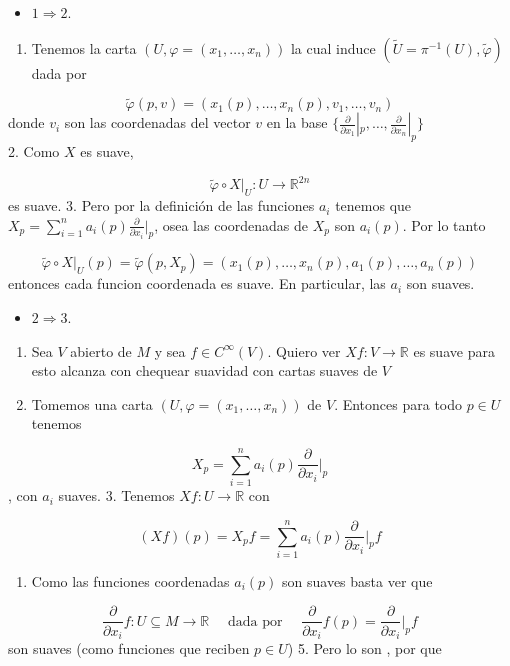 \begin{bookproof}{}
\begin{itemize}
\item $1 \Rightarrow 2$.
\end{itemize}
\begin{enumerate}
\item Tenemos la carta $(U,\varphi=(x_{1},\ldots,x_{n}))$ la cual induce $(\widetilde{U}=\pi ^{-1}(U),\widetilde{\varphi})$ dada por
\end{enumerate}
\[
\widetilde\varphi(p,v)=(x_1(p),\ldots,x_n(p),v_1,\ldots,v_n)
\]
donde $v_i$ son las coordenadas del vector $v$ en la base $\{ \frac{\partial}{\partial x_{1}}|_{p},\ldots,\frac{\partial}{\partial x_{n}}|_{p} \}$\\
2. Como $X$ es suave,

\[
\widetilde\varphi \circ X|_U:U \to \mathbb R^{2n}
\]
es suave. 3. Pero por la definición de las funciones $a_i$ tenemos que $X_p=\sum_{i=1}^n a_i(p)\frac{\partial}{\partial x_i}|_p$, osea las coordenadas de $X_p$ son $a_i(p)$. Por lo tanto

\[
\widetilde\varphi \circ X|_U(p)=\widetilde{\varphi}(p,X_{p})=(x_1(p),\ldots,x_n(p),a_1(p),\ldots,a_n(p))
\]
entonces cada funcion coordenada es suave. En particular, las $a_i$ son suaves.

\begin{itemize}
\item $2 \Rightarrow 3$.
\end{itemize}
\begin{enumerate}
\item Sea $V$ abierto de $M$ y sea $f \in C^\infty(V)$. Quiero ver $Xf:V\rightarrow\mathbb{R}$ es suave para esto alcanza con chequear suavidad con cartas suaves de $V$
\item Tomemos una carta $(U,\varphi=(x_1,\ldots,x_n))$ de $V$. Entonces para todo $p\in U$ tenemos
\end{enumerate}
\[
X_p=\sum_{i=1}^n a_i(p)\frac{\partial}{\partial x_i}|_p
\]
, con $a_i$ suaves. 3. Tenemos $Xf:U \to \mathbb R$ con

\[
(Xf)(p)=X_p f=\sum_{i=1}^n a_i(p)\frac{\partial }{\partial x_i}\bigg|_{p}f
\]
\begin{enumerate}[start=4]
\item Como las funciones coordenadas $a_{i}(p)$ son suaves basta ver que
\end{enumerate}
\[
\frac{\partial}{\partial x_{i}} f:U\subseteq M\rightarrow \mathbb{R}\quad\text{ dada por }\quad \frac{\partial}{\partial x_{i}}f(p)=\frac{\partial}{\partial x_{i}}\bigg|_{p}f
\]
son suaves (como funciones que reciben $p\in U$) 5. Pero lo son , por que


\end{bookproof}
